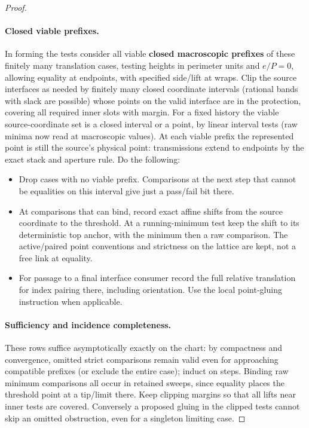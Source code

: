 \begin{proof}
\paragraph{Closed viable prefixes.}

In forming the tests consider all viable \textbf{closed macroscopic prefixes} of these finitely many
translation cases, testing heights in perimeter units and \(e/P=0\), allowing equality at endpoints, with
specified side/lift at wraps. Clip the source interfaces as needed by finitely many closed coordinate
intervals (rational bands with slack are possible) whose points on the valid interface are in the
protection, covering all required inner slots with margin. For a fixed history the viable source-coordinate
set is a closed interval or a point, by linear interval tests (raw minima now read at macroscopic values).
At each viable prefix the represented point is still the source's physical point: transmissions extend to
endpoints by the exact stack and aperture rule. Do the following:
\begin{itemize}
\item Drop cases with no viable prefix. Comparisons at the next step that cannot be equalities on this interval give just a pass/fail bit there.
\item At comparisons that can bind, record exact affine shifts from the source coordinate to the threshold. At a running-minimum test keep the shift to its deterministic top anchor, with the minimum then a raw comparison. The active/paired point conventions and strictness on the lattice are kept, not a free link at equality.
\item For passage to a final interface consumer record the full relative translation for index pairing there, including orientation. Use the local point-gluing instruction when applicable.
\end{itemize}

\paragraph{Sufficiency and incidence completeness.}

These rows suffice asymptotically exactly on the chart: by compactness and convergence, omitted strict
comparisons remain valid even for approaching compatible prefixes (or exclude the entire case); induct on
steps. Binding raw minimum comparisons all occur in retained sweeps, since equality places the threshold
point at a tip/limit there. Keep clipping margins so that all lifts near inner tests are covered. Conversely
a proposed gluing in the clipped tests cannot skip an omitted obstruction, even for a singleton limiting
case.


\end{proof}
